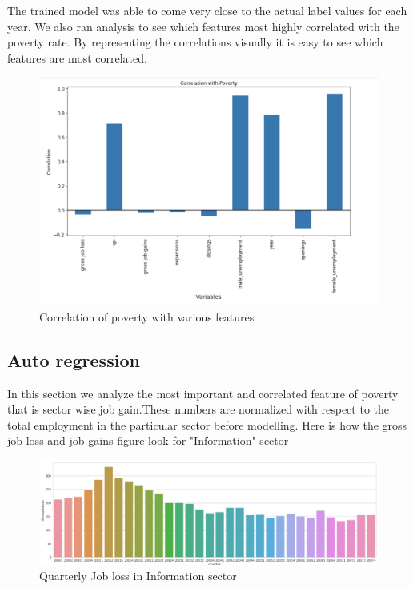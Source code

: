 \documentclass[11pt,letterpaper]{article}
\begin{document}
The trained model was able to come very close to the actual label values for each year. We also ran analysis to see which features most highly correlated with the poverty rate. By representing the correlations visually it is easy to see which features are most correlated. 

\begin{figure}[h]
	\includegraphics[width=\linewidth]{"./pictures/Correlation_With_Poverty"}
	\caption{Correlation of poverty with various features}
    \label{fig:Feature Correlation}
\end{figure}

\subsection{Auto regression}
\label{ssec:autoregResult}

In this section we analyze the most important and correlated feature of poverty that is sector wise job gain.These numbers are normalized with respect to the total employment in the particular sector before modelling. Here is how the gross job loss and job gains figure look for "Information" sector

\begin{figure}[h]
	\includegraphics[width=\linewidth]{"./pictures/jobloss"}
	\caption{Quarterly Job loss in Information sector}
    \label{fig:Job loss figures in Information sector}
\end{figure}
\end{document}
